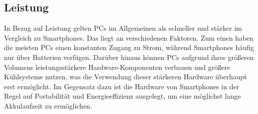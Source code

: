 \subsection{Leistung}\label{PcVsPhone:Leistung}
In Bezug auf Leistung gelten PCs im Allgemeinen als schneller und stärker im Vergleich zu Smartphones. 
	Das liegt an verschiedenen Faktoren. Zum einen haben die meisten PCs einen konstanten Zugang zu Strom, während Smartphones häufig nur über Batterien verfügen. Darüber hinaus können PCs aufgrund ihres größeren Volumens leistungsstärkere Hardware-Komponenten verbauen und größere Kühlsysteme nutzen, was die Verwendung dieser stärkeren Hardware überhaupt erst ermöglicht.\newline%
Im Gegensatz dazu ist die Hardware von Smartphones in der Regel auf Portabilität und Energieeffizienz ausgelegt, um eine möglichst lange Akkulaufzeit zu ermöglichen.\newline%
%
%
%
%
%
%
%
%	
%	
%	
%
